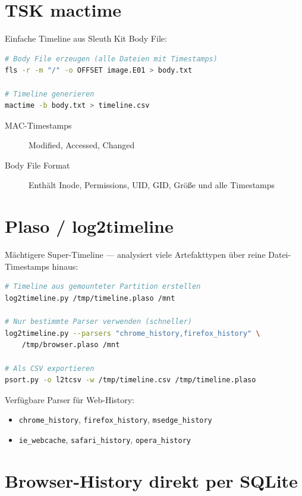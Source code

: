 \section{TSK mactime}

Einfache Timeline aus Sleuth Kit Body File:

\begin{lstlisting}[language=bash]
# Body File erzeugen (alle Dateien mit Timestamps)
fls -r -m "/" -o OFFSET image.E01 > body.txt

# Timeline generieren
mactime -b body.txt > timeline.csv
\end{lstlisting}

\begin{description}
    \item[MAC-Timestamps] Modified, Accessed, Changed
    \item[Body File Format] Enthält Inode, Permissions, UID, GID, Größe und alle Timestamps
\end{description}

\section{Plaso / log2timeline}

Mächtigere Super-Timeline — analysiert viele Artefakttypen über reine Datei-Timestamps hinaus:

\begin{lstlisting}[language=bash]
# Timeline aus gemounteter Partition erstellen
log2timeline.py /tmp/timeline.plaso /mnt

# Nur bestimmte Parser verwenden (schneller)
log2timeline.py --parsers "chrome_history,firefox_history" \
    /tmp/browser.plaso /mnt

# Als CSV exportieren
psort.py -o l2tcsv -w /tmp/timeline.csv /tmp/timeline.plaso
\end{lstlisting}

Verfügbare Parser für Web-History:
\begin{itemize}
    \item \texttt{chrome\_history}, \texttt{firefox\_history}, \texttt{msedge\_history}
    \item \texttt{ie\_webcache}, \texttt{safari\_history}, \texttt{opera\_history}
\end{itemize}

\section{Browser-History direkt per SQLite}

